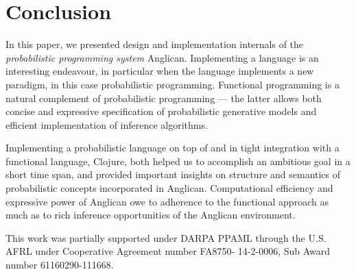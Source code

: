 \documentclass[preprint]{sigplanconf}
\begin{document}
\section{Conclusion}
\label{seq:summary}

In this paper, we presented design and implementation internals
of the \emph{probabilistic programming system} Anglican. Implementing
a language is an interesting endeavour, in particular when the
language implements a new paradigm, in this case probabilistic
programming. Functional programming is a natural complement of
probabilistic programming --- the latter allows both concise and
expressive specification of probabilistic generative models and
efficient implementation of inference algorithms.

Implementing a probabilistic language on top of and in tight
integration with a functional language, Clojure, both helped
us to accomplish an ambitious goal in a short time span, and
provided important insights on structure and semantics of
probabilistic concepts incorporated in Anglican. Computational
efficiency and expressive power of Anglican owe to adherence to
the functional approach as much as to rich inference
opportunities of the Anglican environment.

\acks

This work was partially supported under DARPA PPAML through the
U.S. AFRL under Cooperative Agreement number FA8750- 14-2-0006,
Sub Award number 61160290-111668.



\end{document}
